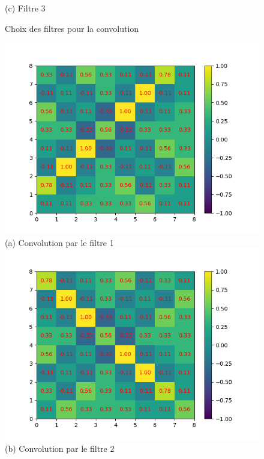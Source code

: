 \begin{figure}[h]
        \center
        (c) Filtre 3
    \endminipage
    \caption{Choix des filtres pour la convolution}
\end{figure}


\newpage

\begin{figure}[h]
        \includegraphics[width=\textwidth]{img/cnn_exemple/cross/convolution_filtre_1.png}
        \center
        (a) Convolution par le filtre 1
    \endminipage\hfill
        \includegraphics[width=\textwidth]{img/cnn_exemple/cross/convolution_filtre_2.png}
        \center
        (b) Convolution par le filtre 2
    \endminipage\hfill

\end{figure}
